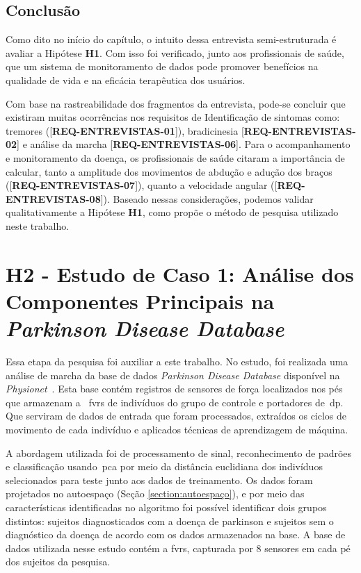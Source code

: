 \subsection{Conclusão}
Como dito no início do capítulo, o intuito dessa entrevista semi-estruturada é avaliar a Hipótese \textbf{H1}. Com isso foi verificado, junto aos profissionais de saúde, que um sistema de monitoramento de dados pode promover benefícios na qualidade de vida e na eficácia terapêutica dos usuários.

Com base na rastreabilidade dos fragmentos da entrevista, pode-se concluir que existiram muitas ocorrências nos requisitos de Identificação de sintomas como: tremores ([\textbf{REQ-ENTREVISTAS-01}]), bradicinesia [\textbf{REQ-ENTREVISTAS-02}] e análise da marcha [\textbf{REQ-ENTREVISTAS-06}]. Para o acompanhamento e monitoramento da doença, os profissionais de saúde citaram a importância de calcular, tanto a amplitude dos movimentos de abdução e adução dos braços ([\textbf{REQ-ENTREVISTAS-07}]), quanto a velocidade angular ([\textbf{REQ-ENTREVISTAS-08}]). Baseado nessas considerações, podemos validar qualitativamente a Hipótese \textbf{H1}, como propõe o método de pesquisa utilizado neste trabalho.


\section{H2 - Estudo de Caso 1: Análise dos Componentes Principais na \textit{Parkinson Disease Database}}\label{section:analise_marcha_pca}
Essa etapa da pesquisa foi auxiliar a este trabalho. No estudo, foi realizada uma análise de marcha da base de dados \textit{Parkinson Disease Database} disponível na \textit{Physionet}~\cite{physionet}. Esta base contém registros de sensores de força localizados nos pés que armazenam a ~\ac{fvrs} de indivíduos do grupo de controle e portadores de~\ac{dp}. Que serviram de dados de entrada que foram processados, extraídos os ciclos de movimento de cada indivíduo e aplicados técnicas de aprendizagem de máquina.

A abordagem utilizada foi de processamento de sinal, reconhecimento de padrões e classificação usando~\ac{pca} por meio da distância euclidiana dos indivíduos selecionados para teste junto aos dados de treinamento. Os dados foram projetados no autoespaço (Seção \ref{section:autoespaço}), e por meio das características identificadas no algoritmo foi possível identificar dois grupos distintos: sujeitos diagnosticados com a doença de parkinson e sujeitos sem o diagnóstico da doença de acordo com os dados armazenados na base. A base de dados utilizada nesse estudo contém a \ac{fvrs}, capturada por 8 sensores em cada pé dos sujeitos da pesquisa.


